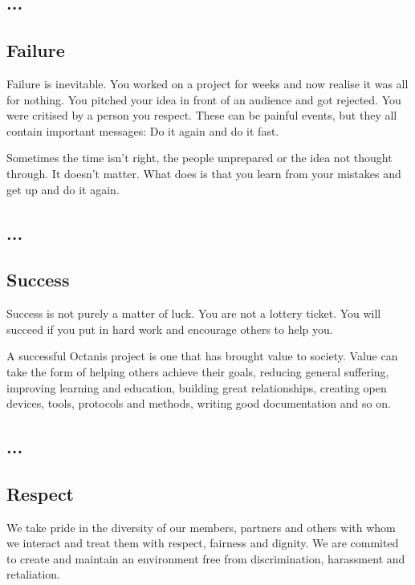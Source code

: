\french
	\subsection{...}


\english
	\subsection{Failure}
	Failure is inevitable. You worked on a project for weeks and now realise it was all for nothing. You pitched your idea in front of an audience and got rejected. You were critised by a person you respect. 
	These can be painful events, but they all contain important messages: Do it again and do it fast.

	Sometimes the time isn't right, the people unprepared or the idea not thought through. It doesn't matter. What does is that you learn from your mistakes and get up and do it again. 



\french
	\subsection{...}


\english
	\subsection{Success}
	
	Success is not purely a matter of luck. You are not a lottery ticket. You will succeed if you put in hard work and encourage others to help you. 


	A successful Octanis project is one that has brought value to society. Value can take the form of helping others achieve their goals, reducing general suffering, improving learning and education, building great relationships, creating open devices, tools, protocols and methods, writing good documentation and so on.


\french
	\subsection{...}


\english
	\subsection{Respect}
 	We take pride in the diversity of our members, partners and others with whom we interact and treat them with respect, fairness and dignity. We are commited to create and maintain an environment free from discrimination, harassment and retaliation. 

